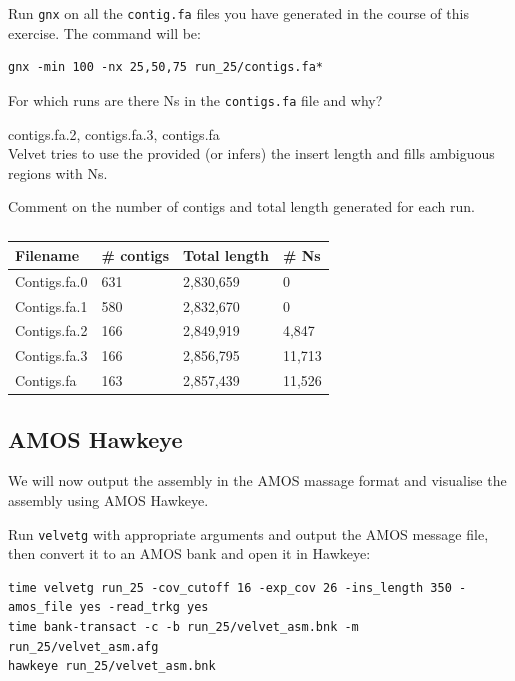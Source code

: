 \begin{steps}
Run \texttt{gnx} on all the \texttt{contig.fa} files you have generated in the
course of this exercise. The command will be:
\begin{lstlisting}
gnx -min 100 -nx 25,50,75 run_25/contigs.fa*
\end{lstlisting}
\end{steps}

\begin{questions}
For which runs are there Ns in the \texttt{contigs.fa} file and why? 
\begin{answer}
contigs.fa.2, contigs.fa.3, contigs.fa\\
Velvet tries to use the provided (or infers) the insert length and fills
ambiguous regions with Ns.
\end{answer}

Comment on the number of contigs and total length generated for each run.
\begin{answer}
\begin{table}[H]
    \begin{tabular}{ll}
    \toprule
    Filename & \# contigs & Total length & \# Ns \\
    \midrule
    Contigs.fa.0 & 631 & 2,830,659 & 0 \\
    Contigs.fa.1 & 580 & 2,832,670 & 0 \\
    Contigs.fa.2 & 166 & 2,849,919 & 4,847 \\
    Contigs.fa.3 & 166 & 2,856,795 & 11,713 \\
    Contigs.fa & 163 & 2,857,439 & 11,526 \\
    \bottomrule
    \end{tabular}%
  \caption{\label{tab:velvetrunresults}}%
\end{table}%
\end{answer}
\end{questions}

\subsection{AMOS Hawkeye}

We will now output the assembly in the AMOS massage format and visualise the
assembly using AMOS Hawkeye.

\begin{steps}
Run \texttt{velvetg} with appropriate arguments and output the AMOS message
file, then convert it to an AMOS bank and open it in Hawkeye:
\begin{lstlisting}
time velvetg run_25 -cov_cutoff 16 -exp_cov 26 -ins_length 350 -amos_file yes -read_trkg yes 
time bank-transact -c -b run_25/velvet_asm.bnk -m run_25/velvet_asm.afg         
hawkeye run_25/velvet_asm.bnk
\end{lstlisting}
\end{steps}

